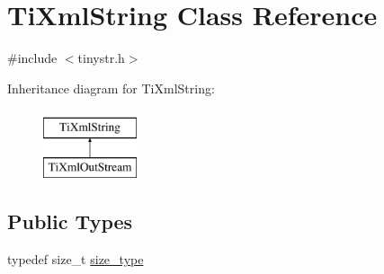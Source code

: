 \hypertarget{class_ti_xml_string}{\section{Ti\-Xml\-String Class Reference}
\label{class_ti_xml_string}
}


{\ttfamily \#include $<$tinystr.\-h$>$}

Inheritance diagram for Ti\-Xml\-String\-:\begin{figure}[H]
\begin{center}
\leavevmode
\includegraphics[height=2.000000cm]{class_ti_xml_string}
\end{center}
\end{figure}
\subsection*{Public Types}
\begin{DoxyCompactItemize}
\item 
typedef size\-\_\-t \hyperlink{class_ti_xml_string_abeb2c1893a04c17904f7c06546d0b971}{size\-\_\-type}
\end{DoxyCompactItemize}

